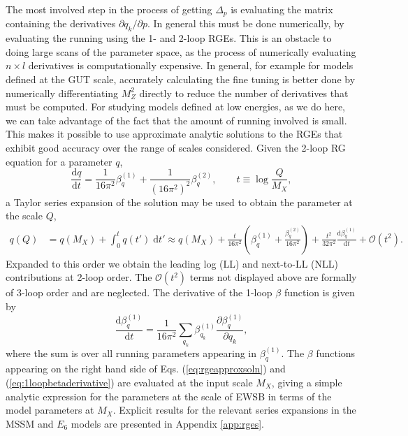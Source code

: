 \documentclass[preprint,amsmath,amssymb,aps,superscriptaddress,prd,showpacs,floatfix]{revtex4-1}
\begin{document}
The most involved step in the process of getting $\Delta_p$ is evaluating the matrix containing the derivatives $\partial q_k/\partial p$. In general this must be done numerically, by evaluating the running using the 1- and 2-loop RGEs. This is an obstacle to doing large scans of the parameter space, as the process of numerically evaluating $n\times l$ derivatives is computationally expensive. In general, for example for models defined at the GUT scale, accurately calculating the fine tuning is better done by numerically differentiating $M_Z^2$ directly to reduce the number of derivatives that must be computed. For studying models defined at low energies, as we do here, we can take advantage of the fact that the amount of running involved is small. This makes it possible to use approximate analytic solutions to the RGEs that exhibit good accuracy over the range of scales considered. Given the 2-loop RG equation for a parameter $q$,
\begin{equation}\label{eq:rge}
\frac{\textrm{d}q}{\mathrm{d}t}=\frac{1}{16\pi^2}\beta_q^{(1)}+\frac{1}{(16\pi^2)^2}\beta_q^{(2)},\qquad t\equiv \log\frac{Q}{M_X},
\end{equation}
a Taylor series expansion of the solution may be used to obtain the parameter at the scale $Q$,
\begin{align}\label{eq:rgeapproxsoln}
q(Q)&=q(M_X)+\int_0^t q(t')\;\textrm{d}t'\approx q(M_X)+\frac{t}{16\pi^2}\left ( \beta_q^{(1)}+\frac{\beta_q^{(2)}}{16\pi^2}\right )+\frac{t^2}{32\pi^2}\frac{\textrm{d}\beta_q^{(1)}}{\textrm{d}t}+\mathcal{O}(t^2).
\end{align}
Expanded to this order we obtain the leading log (LL) and next-to-LL (NLL) contributions at 2-loop order. The $\mathcal{O}(t^2)$ terms not displayed above are formally of 3-loop order and are neglected. The derivative of the 1-loop $\beta$ function is given by
\begin{equation}\label{eq:1loopbetaderivative}
\frac{\textrm{d}\beta_q^{(1)}}{\textrm{d}t}=\frac{1}{16\pi^2}\sum_{q_k}\beta_{q_k}^{(1)}\frac{\partial \beta_q^{(1)}}{\partial q_k},
\end{equation}
where the sum is over all running parameters appearing in $\beta_q^{(1)}$. The $\beta$ functions appearing on the right hand side of Eqs. (\ref{eq:rgeapproxsoln}) and (\ref{eq:1loopbetaderivative}) are evaluated at the input scale $M_X$, giving a simple analytic expression for the parameters at the scale of EWSB in terms of the model parameters at $M_X$. Explicit results for the relevant series expansions in the MSSM and $E_6$ models are presented in Appendix \ref{app:rges}.
\end{document}
